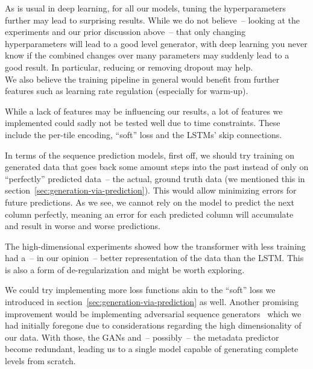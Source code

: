 As is usual in deep learning, for all our models, tuning the
hyperparameters further may lead to surprising results. While we do
not believe~-- looking at the experiments and our prior discussion
above~-- that only changing hyperparameters will lead to a good level
generator, with deep learning you never know if the combined changes
over many parameters may suddenly lead to a good result. In
particular, reducing or removing dropout may help. \\
We also believe the training pipeline in general would benefit from
further features such as learning rate regulation (especially for
warm-up).

While a lack of features may be influencing our results, a lot of
features we implemented could sadly not be tested well due to time
constraints. These include the per-tile encoding, ``soft'' loss and
the LSTMs' skip connections.

In terms of the sequence prediction models, first off, we should try
training on generated data that goes back some amount steps into the
past instead of only on ``perfectly'' predicted data~-- the actual,
ground truth data (we mentioned this in
section~\ref{sec:generation-via-prediction}). This would allow
minimizing errors for future predictions. As we see, we cannot rely on
the model to predict the next column perfectly, meaning an error for
each predicted column will accumulate and result in worse and worse
predictions.

The high-dimensional experiments showed how the transformer with less
training had a~-- in our opinion~-- better representation of the data
than the LSTM. This is also a form of de-regularization and might be
worth exploring.

We could try implementing more loss functions akin to the ``soft''
loss we introduced in section~\ref{sec:generation-via-prediction} as
well. Another promising improvement would be implementing adversarial
sequence
generators~\cite{yuSeqGANSequenceGenerative2017,liAdversarialDiscreteSequence}
which we had initially foregone due to considerations regarding the
high dimensionality of our data. With those, the GANs and~-- possibly~--
the metadata predictor become redundant, leading us to a single model
capable of generating complete levels from scratch.



